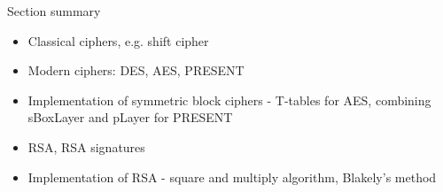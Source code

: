 \begin{frame}{Section summary}
    \begin{itemize}
        \item Classical ciphers, e.g. shift cipher
        \item Modern ciphers: DES, AES, PRESENT
        \item Implementation of symmetric block ciphers - T-tables for AES, combining sBoxLayer and pLayer for PRESENT
        \item RSA, RSA signatures
        \item Implementation of RSA - square and multiply algorithm, Blakely's method
    \end{itemize}
\end{frame}